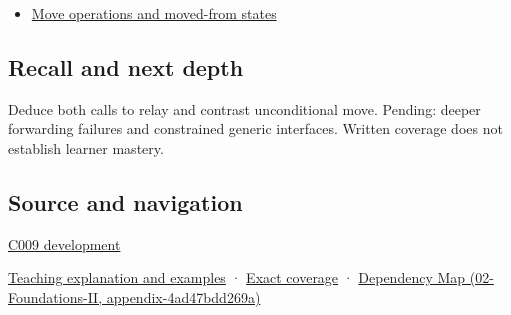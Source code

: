 \begin{itemize}
\tightlist
\item
  \hyperref[appendix-5636651017c2]{Move operations and moved-from states}
\end{itemize}

\subsection{Recall and next depth}\label{appendix-0104b704fb11-recall-and-next-depth}

Deduce both calls to relay and contrast unconditional move. Pending: deeper forwarding failures and constrained generic interfaces. Written coverage does not establish learner mastery.

\subsection{Source and navigation}\label{appendix-0104b704fb11-source-and-navigation}

\hyperref[appendix-fd090d982a15-m009---parts-127-147]{C009 development}

\hyperref[01-foundations-i-ch003-move-permission-is-not-resource-transfer]{Teaching explanation and examples} · \hyperref[appendix-fd090d982a15-m008---parts-113-126]{Exact coverage} · \href{../02-Foundations-II/main.pdf\#nameddest=appendix-4ad47bdd269a}{Dependency Map (02-Foundations-II, appendix-4ad47bdd269a)}
